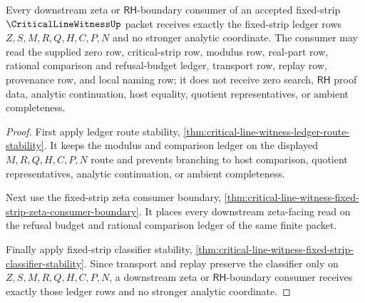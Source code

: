 \begin{theorem}
\label{thm:critical-line-witness-fixed-strip-ledger-exactness}
Every downstream zeta or $\mathsf{RH}$-boundary consumer of an accepted
fixed-strip $\CriticalLineWitnessUp$ packet receives exactly the fixed-strip
ledger rows $Z,S,M,R,Q,H,C,P,N$ and no stronger analytic coordinate. The
consumer may read the supplied zero row, critical-strip row, modulus row,
real-part row, rational comparison and refusal-budget ledger, transport
row, replay row, provenance row, and local naming row; it does not receive
zero search, $\mathsf{RH}$ proof data, analytic continuation, host equality,
quotient representatives, or ambient completeness.
\end{theorem}
\begin{proof}
First apply ledger route stability,
\autoref{thm:critical-line-witness-ledger-route-stability}. It keeps the
modulus and comparison ledger on the displayed $M,R,Q,H,C,P,N$ route and
prevents branching to host comparison, quotient representatives, analytic
continuation, or ambient completeness.

Next use the fixed-strip zeta consumer boundary,
\autoref{thm:critical-line-witness-fixed-strip-zeta-consumer-boundary}. It
places every downstream zeta-facing read on the refusal budget and rational
comparison ledger of the same finite packet.

Finally apply fixed-strip classifier stability,
\autoref{thm:critical-line-witness-fixed-strip-classifier-stability}. Since
transport and replay preserve the classifier only on
$Z,S,M,R,Q,H,C,P,N$, a downstream zeta or $\mathsf{RH}$-boundary consumer
receives exactly those ledger rows and no stronger analytic coordinate.
\end{proof}
